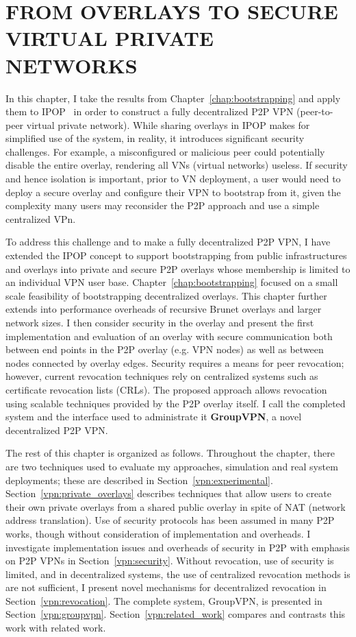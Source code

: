\chapter{FROM OVERLAYS TO SECURE VIRTUAL PRIVATE NETWORKS}
\label{chap:security}

In this chapter, I take the results from Chapter~\ref{chap:bootstrapping} and
apply them to IPOP~\cite{ipop} in order to construct a fully decentralized P2P
VPN (peer-to-peer virtual private network).  While sharing overlays in IPOP
makes for simplified use of the system, in reality, it introduces significant
security challenges.  For example, a misconfigured or malicious peer could
potentially disable the entire overlay, rendering all VNs (virtual networks)
useless.  If security and hence isolation is important, prior to VN deployment,
a user would need to deploy a secure overlay and configure their VPN to
bootstrap from it, given the complexity many users may reconsider the P2P
approach and use a simple centralized VPn.

To address this challenge and to make a fully decentralized P2P VPN, I have
extended the IPOP concept to support bootstrapping from public infrastructures
and overlays into private and secure P2P overlays whose membership is limited
to an individual VPN user base.  Chapter~\ref{chap:bootstrapping} focused on a
small scale feasibility of bootstrapping decentralized overlays.  This chapter
further extends into performance overheads of recursive Brunet overlays and
larger network sizes.  I then consider security in the overlay and present the
first implementation and evaluation of an overlay with secure communication
both between end points in the P2P overlay (e.g. VPN nodes) as well as between
nodes connected by overlay edges.  Security requires a means for peer
revocation; however, current revocation techniques rely on centralized systems
such as certificate revocation lists (CRLs). The proposed approach allows
revocation using scalable techniques provided by the P2P overlay itself.  I
call the completed system and the interface used to administrate it {\bf
GroupVPN}, a novel decentralized P2P VPN.

The rest of this chapter is organized as follows.  Throughout the chapter,
there are two techniques used to evaluate my approaches, simulation and real
system deployments; these are described in Section~\ref{vpn:experimental}.
Section~\ref{vpn:private_overlays} describes techniques that allow users to
create their own private overlays from a shared public overlay in spite of NAT
(network address translation).  Use of security protocols has been assumed in
many P2P works, though without consideration of implementation and overheads. I
investigate implementation issues and overheads of security in P2P with
emphasis on P2P VPNs in Section~\ref{vpn:security}.  Without revocation, use of
security is limited, and in decentralized systems, the use of centralized
revocation methods is are not sufficient, I present novel mechanisms for
decentralized revocation in Section~\ref{vpn:revocation}.  The complete system,
GroupVPN, is presented in Section~\ref{vpn:groupvpn}.
Section~\ref{vpn:related_work} compares and contrasts this work with related
work.  

